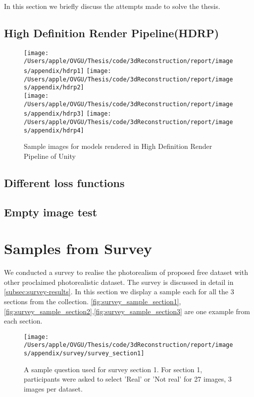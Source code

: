 In this section we briefly discuss the attempts made to solve the thesis.

\subsection{High Definition Render Pipeline(HDRP)}


\begin{figure}[ht]
    \centering
    \texttt{[image: /Users/apple/OVGU/Thesis/code/3dReconstruction/report/images/appendix/hdrp1]}
    \texttt{[image: /Users/apple/OVGU/Thesis/code/3dReconstruction/report/images/appendix/hdrp2]}\\
    \vspace{0.1cm}
    \texttt{[image: /Users/apple/OVGU/Thesis/code/3dReconstruction/report/images/appendix/hdrp3]}
    \texttt{[image: /Users/apple/OVGU/Thesis/code/3dReconstruction/report/images/appendix/hdrp4]}\\
    \caption{Sample images for models rendered in High Definition Render Pipeline of Unity}
    \label{fig:hdrp}
\end{figure}


\subsection{Different loss functions}

\subsection{Empty image test}


\section{Samples from Survey}\label{sec:samples-from-survey}
We conducted a survey to realise the photorealism of proposed \gls{free} dataset with other proclaimed photorealistic dataset.
The survey is discussed in detail in \autoref{subsec:survey-results}.
In this section we display a sample each for all the 3 sections from the collection.
\autoref{fig:survey_sample_section1},\autoref{fig:survey_sample_section2},\autoref{fig:survey_sample_section3} are one example from each section.


\begin{figure}
    \centering
    \texttt{[image: /Users/apple/OVGU/Thesis/code/3dReconstruction/report/images/appendix/survey/survey\_section1]}
    \caption{A sample question used for survey section 1. For section 1, participants were asked to select 'Real' or 'Not real' for 27 images, 3 images per dataset.}
    \label{fig:survey_sample_section1}
\end{figure}

